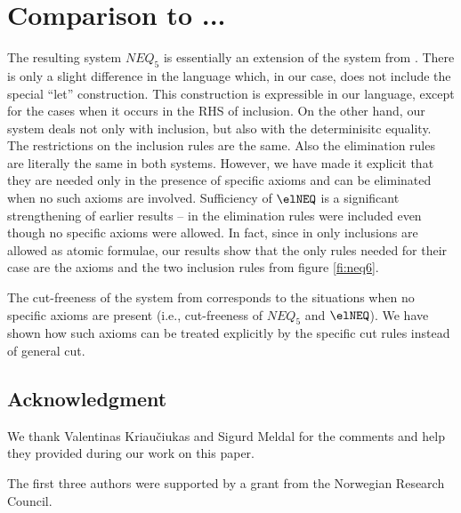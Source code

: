 %

\section{Comparison to ...}
The resulting system $NEQ_5$ is essentially an extension of the system from
\cite{BK95}. There is only a slight difference in the language which, in our case,
does not include the special ``let'' construction. This construction is
expressible in our language, except for the cases when it occurs in the RHS
of inclusion. On the other hand, our system
deals not only with inclusion, but also with the determinisitc equality.
The restrictions on the inclusion rules are the same.
Also the elimination rules are literally the same in both systems. However, we have
made it explicit that they are needed only in the presence of specific axioms
and can be eliminated when no such axioms are involved. Sufficiency of $\elNEQ$ is a significant
strengthening of earlier results -- in \cite{BK95} the elimination rules were included
even though no specific axioms were allowed. In fact, since in \cite{BK95}
only inclusions are allowed as atomic formulae, our results show that the
only rules needed for their case are the axioms and the two inclusion rules
from figure \ref{fi:neq6}.

The cut-freeness of the system from \cite{BK95} corresponds to the situations when
no specific axioms are present (i.e., cut-freeness of $NEQ_5$ and $\elNEQ$). 
We have shown how such axioms can be treated explicitly by
the specific cut rules instead of general cut.

\subsection*{Acknowledgment}
We thank Valentinas Kriau\v ciukas and Sigurd
Meldal for the comments and help they provided during our work on this paper.

The first three authors were supported by a grant from the Norwegian Research Council.

